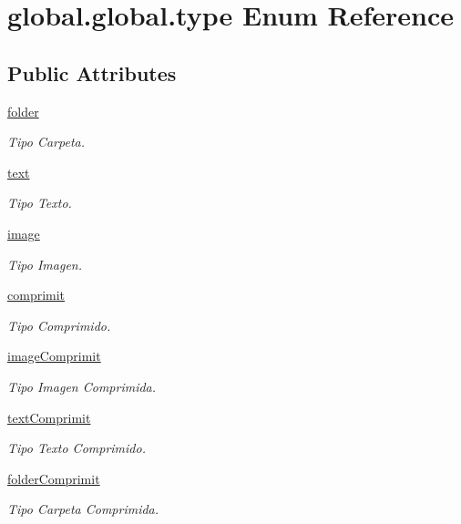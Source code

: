 \hypertarget{enumglobal_1_1global_1_1type}{}\section{global.\+global.\+type Enum Reference}
\label{enumglobal_1_1global_1_1type}
\subsection*{Public Attributes}
\begin{DoxyCompactItemize}
\item 
\hyperlink{enumglobal_1_1global_1_1type_aa458dc01bb892823f07d6be4b0b57577}{folder}
\begin{DoxyCompactList}\small\item\em Tipo Carpeta. \end{DoxyCompactList}\item 
\hyperlink{enumglobal_1_1global_1_1type_a16c0f233e8e06dc4aead8525cff2406f}{text}
\begin{DoxyCompactList}\small\item\em Tipo Texto. \end{DoxyCompactList}\item 
\hyperlink{enumglobal_1_1global_1_1type_a2f282935de5fcf5f8edc68c9a3517641}{image}
\begin{DoxyCompactList}\small\item\em Tipo Imagen. \end{DoxyCompactList}\item 
\hyperlink{enumglobal_1_1global_1_1type_adc67cb7ae7dcecf7cc33f1802f2df3bf}{comprimit}
\begin{DoxyCompactList}\small\item\em Tipo Comprimido. \end{DoxyCompactList}\item 
\hyperlink{enumglobal_1_1global_1_1type_ae0e61b2c31493ca288b0c0c421302ba0}{image\+Comprimit}
\begin{DoxyCompactList}\small\item\em Tipo Imagen Comprimida. \end{DoxyCompactList}\item 
\hyperlink{enumglobal_1_1global_1_1type_aedc29eabcda96a770d2435978d4cc736}{text\+Comprimit}
\begin{DoxyCompactList}\small\item\em Tipo Texto Comprimido. \end{DoxyCompactList}\item 
\hyperlink{enumglobal_1_1global_1_1type_a3ce674f6bd1b8c8d2f5760b8c6ad0be6}{folder\+Comprimit}
\begin{DoxyCompactList}\small\item\em Tipo Carpeta Comprimida. \end{DoxyCompactList}\end{DoxyCompactItemize}


